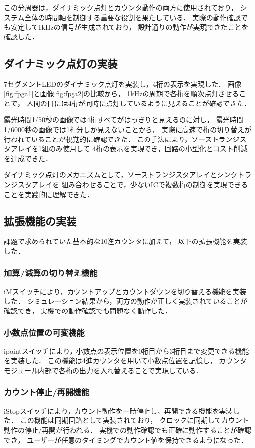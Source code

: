 \documentclass[a4paper,11pt]{ltjsarticle}
\begin{document}
この分周器は，ダイナミック点灯とカウンタ動作の両方に使用されており，
システム全体の時間軸を制御する重要な役割を果たしている．
実際の動作確認でも安定して1kHzの信号が生成されており，
設計通りの動作が実現できたことを確認した．

\subsection{ダイナミック点灯の実装}
7セグメントLEDのダイナミック点灯を実装し，4桁の表示を実現した．
画像\ref{fig:fpga1}と画像\ref{fig:fpga2}の比較から，
1kHzの周期で各桁を順次点灯させることで，
人間の目には4桁が同時に点灯しているように見えることが確認できた．

露光時間1/50秒の画像では4桁すべてがはっきりと見えるのに対し，
露光時間1/6000秒の画像では1桁分しか見えないことから，
実際に高速で桁の切り替えが行われていることが視覚的に確認できた．
この手法により，ソーストランジスタアレイを1組のみ使用して
4桁の表示を実現でき，回路の小型化とコスト削減を達成できた．

ダイナミック点灯のメカニズムとして，ソーストランジスタアレイとシンクトランジスタアレイを
組み合わせることで，少ないICで複数桁の制御を実現できることを実践的に理解できた．

\subsection{拡張機能の実装}
課題で求められていた基本的な10進カウンタに加えて，
以下の拡張機能を実装した．

\subsubsection{加算/減算の切り替え機能}
iMスイッチにより，カウントアップとカウントダウンを切り替える機能を実装した．
シミュレーション結果から，両方の動作が正しく実装されていることが確認でき，
実機での動作確認でも問題なく動作した．

\subsubsection{小数点位置の可変機能}
ipointスイッチにより，小数点の表示位置を0桁目から3桁目まで変更できる機能を実装した．
この機能は4進カウンタを用いて小数点位置を記憶し，
カウンタモジュール内部で各桁の出力を入れ替えることで実現している．

\subsubsection{カウント停止/再開機能}
iStopスイッチにより，カウント動作を一時停止し，再開できる機能を実装した．
この機能は同期回路として実装されており，
クロックに同期してカウント動作の停止/再開が行われる．
実機での動作確認でも正確に動作することが確認でき，
ユーザーが任意のタイミングでカウント値を保持できるようになった．
\end{document}
